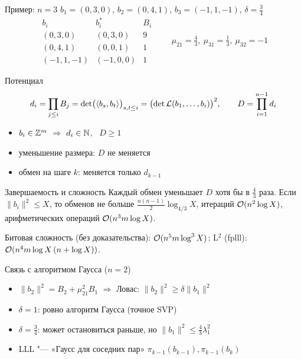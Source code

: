 \documentclass{ca-slides}
\begin{document}
\begin{canvasframe}{Пример: $n = 3$}
  $b_1 = (0, 3, 0)$, \quad $b_2 = (0, 4, 1)$, \quad $b_3 = (-1, 1, -1)$, \quad $\delta = \tfrac34$
  \[
    \begin{array}{c|c|c}
      b_i & b_i^* & B_i \\ \hline
      (0, 3, 0) & (0, 3, 0) & 9 \\
      (0, 4, 1) & (0, 0, 1) & 1 \\
      (-1, 1, -1) & (-1, 0, 0) & 1
    \end{array}
    \qquad \mu_{21} = \tfrac43, \ \mu_{31} = \tfrac13, \ \mu_{32} = -1
  \]
  \notearea[0.3\textheight]
\end{canvasframe}

\begin{canvasframe}{Потенциал}
  \[
    d_i = \prod_{j \le i} B_j = \det\bigl(\langle b_s, b_t\rangle\bigr)_{s,t \le i}
    = \bigl(\det \mathcal{L}(b_1, \dots, b_i)\bigr)^2, \qquad D = \prod_{i=1}^{n-1} d_i
  \]
  \begin{itemize}
    \item $b_i \in \mathbb{Z}^m$ $\Rightarrow$ $d_i \in \mathbb{N}$, \ $D \ge 1$
    \item уменьшение размера: $D$ не меняется
    \item обмен на шаге $k$: меняется только $d_{k-1}$
  \end{itemize}
  \proofarea[0.15\textheight]
\end{canvasframe}

\begin{theoremframe}{Завершаемость и сложность}
  Каждый обмен уменьшает $D$ хотя бы в $\frac43$ раза. Если $\|b_i\|^2 \le X$, то обменов
  не больше $\frac{n(n-1)}{2} \log_{4/3} X$, итераций $\mathcal{O}(n^2 \log X)$, арифметических
  операций $\mathcal{O}(n^3 m \log X)$.
  \par\smallskip
  {\small Битовая сложность (без доказательства): $\mathcal{O}(n^5 m \log^3 X)$; L$^2$ (fplll):
  $\mathcal{O}(n^4 m \log X\,(n + \log X))$.}
\end{theoremframe}

\begin{canvasframe}{Связь с алгоритмом Гаусса ($n = 2$)}
  \begin{itemize}
    \item $\|b_2\|^2 = B_2 + \mu_{21}^2 B_1$ $\Rightarrow$ Ловас: $\|b_2\|^2 \ge \delta \|b_1\|^2$
    \item $\delta = 1$: ровно алгоритм Гаусса (точное SVP)
    \item $\delta = \tfrac34$: может остановиться раньше, но $\|b_1\|^2 \le \tfrac43 \lambda_1^2$
    \item LLL "--- «Гаусс для соседних пар» $\pi_{k-1}(b_{k-1}), \pi_{k-1}(b_k)$
  \end{itemize}
  \notearea[0.25\textheight]
\end{canvasframe}
\end{document}
